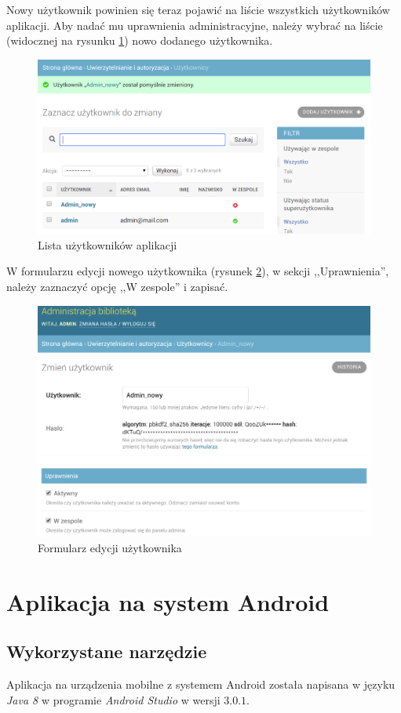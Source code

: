 \documentclass[twoside]{projektInzynierskiMS}
\begin{document}
\newpage

Nowy użytkownik powinien się teraz pojawić na liście wszystkich użytkowników aplikacji. Aby nadać mu uprawnienia administracyjne, należy wybrać na liście (widocznej na rysunku \ref{fig:usersList}) nowo dodanego użytkownika.

\begin{figure}[h]
  \centering
  \includegraphics[width=0.6\linewidth]{img/backend/ListaUser.png}
  \caption{Lista użytkowników aplikacji}
  \label{fig:usersList}
\end{figure}

W formularzu edycji nowego użytkownika (rysunek \ref{fig:editUser}), w sekcji ,,Uprawnienia'', należy zaznaczyć opcję ,,W zespole'' i zapisać.

\begin{figure}[h]
  \centering
  \includegraphics[width=0.6\linewidth]{img/backend/Uprawnienia.png}
  \caption{Formularz edycji użytkownika}
  \label{fig:editUser}
\end{figure}

\section{Aplikacja na system Android}

\subsection{Wykorzystane narzędzie}

Aplikacja na urządzenia mobilne z systemem Android została napisana w języku \textit{Java 8} w programie \textit{Android Studio} w wersji $3.0.1$.
\end{document}
